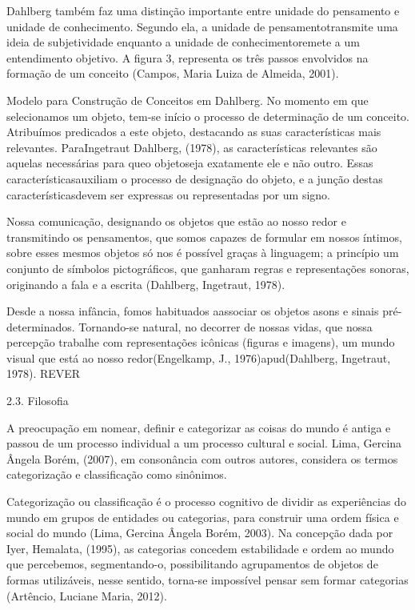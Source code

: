 Dahlberg também faz uma distinção importante entre unidade do pensamento e unidade de conhecimento. Segundo ela, a unidade de pensamentotransmite uma ideia de subjetividade enquanto a unidade de conhecimentoremete a um entendimento objetivo. A figura 3, representa os três passos envolvidos na formação de um conceito (Campos, Maria Luiza de Almeida, 2001).


Modelo para Construção de Conceitos em Dahlberg.
No momento em que selecionamos um objeto, tem-se início o processo de determinação de um conceito. Atribuímos predicados a este objeto, destacando as suas características mais relevantes. ParaIngetraut Dahlberg, (1978), as características relevantes são aquelas necessárias para queo objetoseja exatamente ele e não outro. Essas característicasauxiliam o processo de designação do objeto, e a junção destas característicasdevem ser expressas ou representadas por um signo.

Nossa comunicação, designando os objetos que estão ao nosso redor e transmitindo os pensamentos, que somos capazes de formular em nossos íntimos, sobre esses mesmos objetos só nos é possível graças à linguagem; a princípio um conjunto de símbolos pictográficos, que ganharam regras e representações sonoras, originando a fala e a escrita (Dahlberg, Ingetraut, 1978).

Desde a nossa infância, fomos habituados aassociar os objetos asons e sinais pré-determinados. Tornando-se natural, no decorrer de nossas vidas, que nossa percepção trabalhe com representações icônicas (figuras e imagens), um mundo visual que está ao nosso redor(Engelkamp, J., 1976)apud(Dahlberg, Ingetraut, 1978). REVER

2.3. Filosofia

A preocupação em nomear, definir e categorizar as coisas do mundo é antiga e passou de um processo individual a um processo cultural e social. Lima, Gercina Ângela Borém, (2007), em consonância com outros autores, considera os termos categorização e classificação como sinônimos.

Categorização ou classificação é o processo cognitivo de dividir as experiências do mundo em grupos de entidades ou categorias, para construir uma ordem física e social do mundo (Lima, Gercina Ângela Borém, 2003). Na concepção dada por Iyer, Hemalata, (1995), as categorias concedem estabilidade e ordem ao mundo que percebemos, segmentando-o, possibilitando agrupamentos de objetos de formas utilizáveis, nesse sentido, torna-se impossível pensar sem formar categorias (Artêncio, Luciane Maria, 2012).

